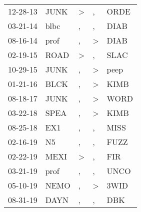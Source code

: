 \begin{supertabular}{lllll}
 12-28-13 &   JUNK &     \textgreater &                , &   ORDE \\
 03-21-14 &   blbc &                , &                , &   DIAB \\
 08-16-14 &   prof &                , &     \textgreater &   DIAB \\
 02-19-15 &   ROAD &     \textgreater &                , &   SLAC \\
 10-29-15 &   JUNK &                , &     \textgreater &   peep \\
 01-21-16 &   BLCK &                , &     \textgreater &   KIMB \\
 08-18-17 &   JUNK &                , &     \textgreater &   WORD \\
 03-22-18 &   SPEA &                , &     \textgreater &   KIMB \\
 08-25-18 &    EX1 &                , &                , &   MISS \\
 02-16-19 &     N5 &                , &                , &   FUZZ \\
 02-22-19 &   MEXI &     \textgreater &                , &    FIR \\
 03-21-19 &   prof &                , &                , &   UNCO \\
 05-10-19 &   NEMO &                , &     \textgreater &   3WID \\
 08-31-19 &   DAYN &                , &                , &    DBK \\
\end{supertabular}
